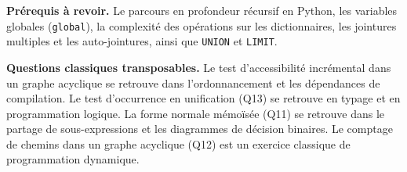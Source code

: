 \documentclass[11pt,a4paper]{article}
\begin{document}
\textbf{Prérequis à revoir.} Le parcours en profondeur récursif en Python, les variables globales (\texttt{global}), la complexité des opérations sur les dictionnaires, les jointures multiples et les auto-jointures, ainsi que \texttt{UNION} et \texttt{LIMIT}.

\textbf{Questions classiques transposables.} Le test d'accessibilité incrémental dans un graphe acyclique se retrouve dans l'ordonnancement et les dépendances de compilation. Le test d'occurrence en unification (Q13) se retrouve en typage et en programmation logique. La forme normale mémoïsée (Q11) se retrouve dans le partage de sous-expressions et les diagrammes de décision binaires. Le comptage de chemins dans un graphe acyclique (Q12) est un exercice classique de programmation dynamique.
\end{document}
